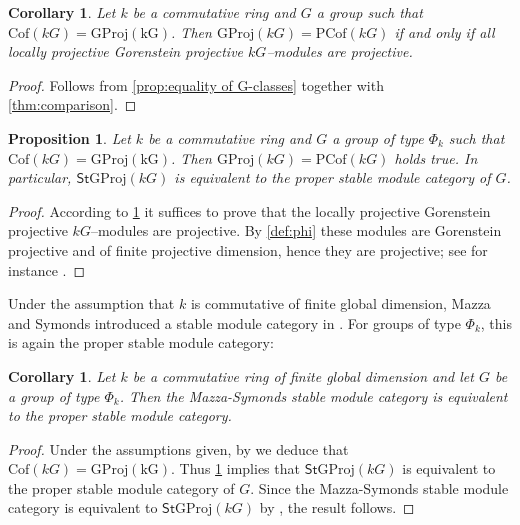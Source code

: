 \documentclass{amsart}
\numberwithin{equation}{section}%
\newtheorem{proposition}[equation]{Proposition}
\newtheorem{corollary}[equation]{Corollary}
\theoremstyle{remark}
\begin{document}
{\begin{corollary}
\label{cor:when all classes agree}
Let $k$ be a commutative ring and $G$ a group such that $\mathrm{Cof}(kG)=\mathrm{GProj(kG)}$. Then $\mathrm{GProj}(kG)=\mathrm{PCof}(kG)$ if and only if  all locally projective Gorenstein projective $kG$--modules are projective.
\end{corollary}

\begin{proof}
Follows from \cref{prop:equality of G-classes} together with \cref{thm:comparison}.
\end{proof}


\begin{proposition}\label{prop-model-hphi-new}
Let $k$ be a commutative ring and $G$ a group of type $\Phi_k$ such that $\mathrm{Cof}(kG)=\mathrm{GProj(kG)}$. Then $\mathrm{GProj}(kG)=\mathrm{PCof}(kG)$ holds true. In particular, $\mathsf{St}{\mathrm{GProj}}(kG)$ is equivalent to the proper stable module category of $G$.
\end{proposition}

\begin{proof}
According to \cref{cor:when all classes agree} it suffices to prove that the locally projective Gorenstein projective $kG$--modules are projective. By \cref{def:phi} these modules are Gorenstein projective and of finite projective dimension, hence they are projective; see for instance \cite[Proposition 2.27]{Holm}. 
\end{proof}


Under the assumption that $k$ is commutative of finite global dimension, Mazza and Symonds introduced a stable module category in \cite[Definition~3.2]{MS19}. For groups of type $\Phi_k$, this is again the proper stable module category: 

\begin{corollary}\label{cor-ms-stable-agrees}
 Let $k$ be a commutative ring of finite global dimension and let $G$ be a group of type $\Phi_k$. Then the Mazza-Symonds stable module category is equivalent to the proper stable module category.
\end{corollary}

\begin{proof}
Under the assumptions given, by \cite[Corollary~2.5]{ET_cof} we deduce that 
$\mathrm{Cof}(kG)=\mathrm{GProj(kG)}$. Thus \cref{prop-model-hphi-new} implies that $\mathsf{St}{\mathrm{GProj}}(kG)$ is equivalent to the proper stable module category of $G$. Since the Mazza-Symonds stable module category is equivalent to $\mathsf{St}{\mathrm{GProj}}(kG)$ by \cite[Theorem 3.10]{MS19}, the result follows.
\end{proof}

}
\end{document}

